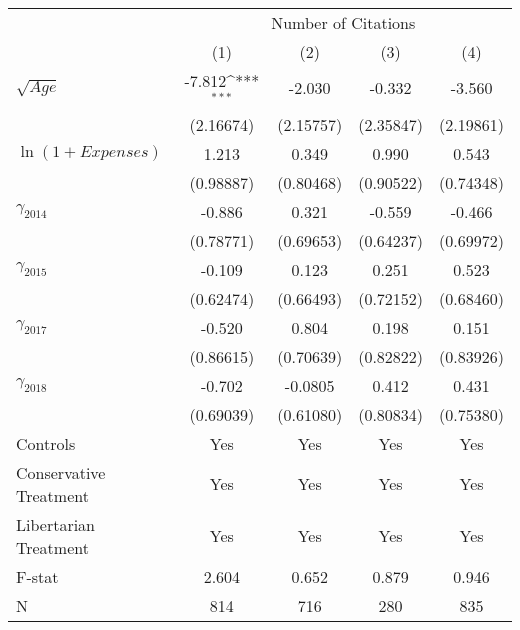 \def\sym#1{\ifmmode^{#1}\else\(^{#1}\)\fi}
\setlength\tabcolsep{17pt}
\begin{tabular}{@{\extracolsep{7pt}}lcccc}
\toprule
                    &\multicolumn{4}{c}{Number of Citations}                                                \\\cmidrule(lr){2-5}
                    &\multicolumn{1}{c}{(1)}         &\multicolumn{1}{c}{(2)}         &\multicolumn{1}{c}{(3)}         &\multicolumn{1}{c}{(4)}         \\
\midrule
$\sqrt{Age}$        &      -7.812\sym{***}&      -2.030         &      -0.332         &      -3.560         \\
                    &   (2.16674)         &   (2.15757)         &   (2.35847)         &   (2.19861)         \\
\addlinespace
\small $\ln(1+Expenses)$&       1.213         &       0.349         &       0.990         &       0.543         \\
                    &   (0.98887)         &   (0.80468)         &   (0.90522)         &   (0.74348)         \\
\addlinespace
\large $\gamma_{2014}$&      -0.886         &       0.321         &      -0.559         &      -0.466         \\
                    &   (0.78771)         &   (0.69653)         &   (0.64237)         &   (0.69972)         \\
\addlinespace
\large $\gamma_{2015}$&      -0.109         &       0.123         &       0.251         &       0.523         \\
                    &   (0.62474)         &   (0.66493)         &   (0.72152)         &   (0.68460)         \\
\addlinespace
\large $\gamma_{2017}$&      -0.520         &       0.804         &       0.198         &       0.151         \\
                    &   (0.86615)         &   (0.70639)         &   (0.82822)         &   (0.83926)         \\
\addlinespace
\large $\gamma_{2018}$&      -0.702         &     -0.0805         &       0.412         &       0.431         \\
                    &   (0.69039)         &   (0.61080)         &   (0.80834)         &   (0.75380)         \\
\midrule
Controls            &         Yes         &         Yes         &         Yes         &         Yes         \\
Conservative Treatment&         Yes         &         Yes         &         Yes         &         Yes         \\
Libertarian Treatment&         Yes         &         Yes         &         Yes         &         Yes         \\
F-stat              &       2.604         &       0.652         &       0.879         &       0.946         \\
N                   &         814         &         716         &         280         &         835         \\
\bottomrule
\end{tabular}
